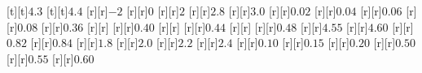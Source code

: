 \begin{psfrags}
[t][t]{$4.3$}%
[t][t]{$4.4$}%
%
[r][r]{$-2\!$}%
[r][r]{$0$}%
[r][r]{$2$}%
[r][r]{$2.8$}%
[r][r]{$3.0$}%
[r][r]{$0.02$}%
[r][r]{$0.04$}%
[r][r]{$0.06$}%
[r][r]{$0.08$}%
[r][r]{$0.36$}%
[r][r]{}%
[r][r]{$0.40$}%
[r][r]{}%
[r][r]{$0.44$}%
[r][r]{}%
[r][r]{$0.48$}%
[r][r]{$4.55$}%
[r][r]{$4.60$}%
[r][r]{$0.82$}%
[r][r]{$0.84$}%
[r][r]{$1.8\!$}%
[r][r]{$2.0$}%
[r][r]{$2.2$}%
[r][r]{$2.4$}%
[r][r]{$0.10$}%
[r][r]{$0.15$}%
[r][r]{$0.20$}%
[r][r]{$0.50$}%
[r][r]{$0.55$}%
[r][r]{$0.60$}%
%
%
\end{psfrags}%
%
